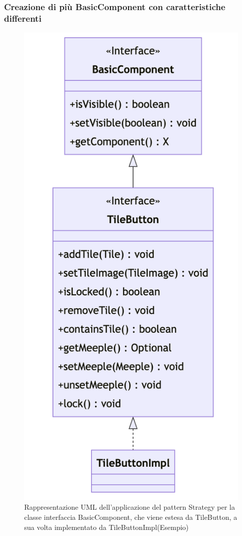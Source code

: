 \subsubsection*{Creazione di più BasicComponent con caratteristiche differenti}
\begin{figure}[ht]
    \centering\includegraphics[scale=.5]{images/basiccomponent.png}
    \caption{Rappresentazione UML dell'applicazione del pattern Strategy per la classe interfaccia BasicComponent, che viene estesa da TileButton, a sua volta implementato da TileButtonImpl(Esempio)}
\end{figure}

